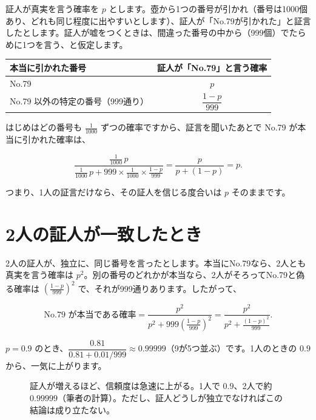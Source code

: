\documentclass[a4paper,11pt,openany]{ltjsbook}
\begin{document}
証人が真実を言う確率を $p$ とします。壺から1つの番号が引かれ（番号は1000個あり、どれも同じ程度に出やすいとします）、証人が「No.79が引かれた」と証言したとします。証人が嘘をつくときは、間違った番号の中から（999個）でたらめに1つを言う、と仮定します。

\begin{center}
\begin{tabular}{lc}
\toprule
本当に引かれた番号 & 証人が「No.79」と言う確率\\
\midrule
No.79 & $p$\\
No.79 以外の特定の番号（999通り） & $\dfrac{1-p}{999}$\\
\bottomrule
\end{tabular}
\end{center}

はじめはどの番号も $\frac1{1000}$ ずつの確率ですから、証言を聞いたあとで No.79 が本当に引かれた確率は、

\[
\frac{\frac1{1000}\,p}{\frac1{1000}\,p+999\times\frac1{1000}\times\frac{1-p}{999}}=\frac{p}{p+(1-p)}=p.
\]

つまり、1人の証言だけなら、その証人を信じる度合いは $p$ そのままです。

\section{2人の証人が一致したとき}

2人の証人が、独立に、同じ番号を言ったとします。本当にNo.79なら、2人とも真実を言う確率は $p^2$。別の番号のどれかが本当なら、2人がそろってNo.79と偽る確率は $\left(\frac{1-p}{999}\right)^2$ で、それが999通りあります。したがって、

\[
\text{No.79 が本当である確率}=\frac{p^2}{p^2+999\left(\frac{1-p}{999}\right)^2}=\frac{p^2}{p^2+\frac{(1-p)^2}{999}}.
\]

$p=0.9$ のとき、$\dfrac{0.81}{0.81+0.01/999}\approx0.99999$（9が5つ並ぶ）です。1人のときの $0.9$ から、一気に上がります。

\begin{figure}[htbp]
\centering
{}
\caption{証人が増えるほど、信頼度は急速に上がる。1人で $0.9$、2人で約 $0.99999$（筆者の計算）。ただし、証人どうしが独立でなければこの結論は成り立たない。}
\end{figure}
\end{document}
